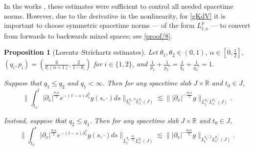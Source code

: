 \documentclass[10pt, reqno]{amsart}
\numberwithin{equation}{section}
\newcommand{\R}{\mathbb{R}}
\newtheorem{proposition}[theorem]{Proposition}
\theoremstyle{definition}
\theoremstyle{remark}
\begin{document}
In the works \cite{Kowal24, FKVZ24}, these estimates were sufficient to control all needed spacetime norms. However, due to the derivative in the nonlinearity, for \eqref{gKdV} it is important to choose symmetric spacetime norms --- of the form $L^p_{t,x}$ --- to convert from forwards to backwards mixed spaces; see \eqref{proof/8}.
\begin{proposition}[Lorentz--Strichartz estimates]\label{prel/strichartz}
    Let $\theta_1,\theta_2 \in (0,1)$, $\alpha \in [0,\frac{1}{2}]$, $(q_i,p_i) = (\frac{6}{\theta_i(\alpha + 1)},\frac{2}{1-\theta_i})$ for $i \in \{1,2\}$, and $\frac{1}{p_2} + \frac{1}{p_2'} = \frac{1}{q_2} + \frac{1}{q_2'} = 1$.

    Suppose that $q_1 \leq q_2$ and $q_1 < \infty$. Then for any spacetime slab $J \times \R$ and $t_0 \in J$,
    \begin{equation*}
        \bigg\|\int_{t_0}^t |\partial_x|^\frac{\theta_1\alpha}{2} e^{-(t-s)\partial_x^3} g(s,\cdot) ds\bigg\|_{L_t^{q_1,2}L_x^{p_1}(J)} \lesssim \big\||\partial_x|^{-\frac{\theta_2\alpha}{2}}g\big\|_{L_t^{q_2'}L_x^{p_2'}(J)}.
    \end{equation*}

    Instead, suppose that $q_2 \leq q_1$. Then for any spacetime slab $J \times \R$ and $t_0 \in J$,
    \begin{equation*}
        \bigg\|\int_{t_0}^t |\partial_x|^\frac{\theta_1\alpha}{2} e^{-(t-s)\partial_x^3} g(s,\cdot) ds\bigg\|_{L_t^{q_1,\frac{2q_1}{q_2}}L_x^{p_1}(J)} \lesssim \big\||\partial_x|^{-\frac{\theta_2\alpha}{2}}g\big\|_{L_t^{q_2',2}L_x^{p_2'}(J)}.
    \end{equation*}
\end{proposition}
\end{document}
